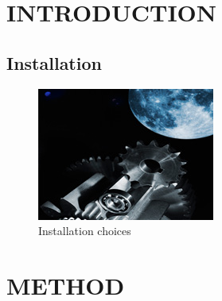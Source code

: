 \documentclass[a4paper, 10pt]{IEEEconf}
\begin{document}


\clearpage
\thispagestyle{empty}
\tableofcontents
\begingroup
\let\clearpage\relax
\listoffigures
\endgroup
\clearpage
\twocolumn

\clearpage
\setcounter{page}{1}
\onecolumn

\section{INTRODUCTION}


\subsection{Installation}

\begin{figure}[H]
  \includegraphics[width=0.5\linewidth, center]{images/mars}
  \caption{Installation choices}
  \label{fig:Installation choices}
\end{figure}


\section{METHOD}


\end{document}
